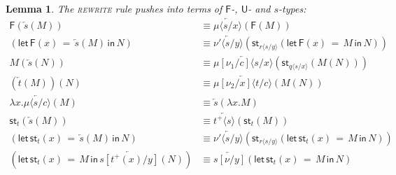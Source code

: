 \documentclass[10pt]{article}
\newtheorem{lemma}{Lemma}
\theoremstyle{definition}
\newcommand{\rewrite}[2]{\overleftarrow{#1}(#2)}
\newcommand\UE[2]{\ensuremath{#1(#2)}}
\newcommand\UI[2]{\ensuremath{\lambda #1.#2}}
\newcommand\StI[2]{\ensuremath{\mathsf{st}_{#1}(#2)}}
\newcommand\StE[4]{\ensuremath{\mathsf{let} \, \StI{#1}{#3} \, = \, {#2} \, \mathsf{in} \, #4}}
\newcommand\FE[3]{\ensuremath{\mathsf{let} \, \mathsf{F}(#2) \, = \, {#1} \, \mathsf{in} \, #3}}
\newcommand\FI[1]{\ensuremath{\mathsf{F}{(#1)}}}
\newcommand\TrPlus[2]{\ensuremath{{#1}^+(#2)}}
\newcommand\ap[2]{\ensuremath{#1 \langle #2 \rangle }}
\newcommand\ApPlus[2]{\ensuremath{{#1}^+ \langle #2 \rangle }}
\begin{document}
\begin{lemma}
The \textsc{rewrite} rule pushes into terms of $\mathsf{F}$-, $\mathsf{U}$- and $s$-types:
\begin{align*}
\FI{\rewrite{s}{M}} &\equiv \rewrite{\ap{\mu}{s/x}}{\FI{M}} \\
(\FE{\rewrite{s}{M}}{x}{N}) &\equiv \rewrite{\ap{\nu'}{s/y}}{\StI{\ap{r}{s/y}}{\FE{M}{x}{N}}} \\
\UE{M}{\rewrite{s}{N}} &\equiv \rewrite{\ap{\mu[\nu_1/c]}{s/x}}{\StI{\ap{q}{s/x}}{\UE{M}{N}}} \\
\UE{(\rewrite{t}{M})}{N} &\equiv \rewrite{\ap{\mu[\nu_2/x]}{t/c}}{\UE{M}{N}} \\
\UI{x}{\rewrite{\ap{\mu}{s/c}}{M}}  &\equiv\rewrite{s}{\UI{x}{M}} \\
\StI{t}{\rewrite{s}{M}} &\equiv \rewrite{\ApPlus{t}{s}}{\StI{t}{M}} \\
(\StE{t}{\rewrite{s}{M}}{x}{N}) &\equiv \rewrite{\ap{\nu'}{s/y}}{\StI{\ap{r}{s/y}}{\StE{t}{M}{x}{N}}} \\
(\StE{t}{M}{x}{\rewrite{s[\TrPlus{t}{x}/y]}{N}}) &\equiv \rewrite{s[\nu/y]}{\StE{t}{M}{x}{N}} 
\end{align*}
\end{lemma}
\end{document}
